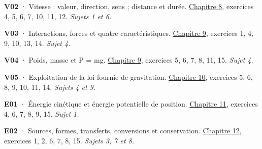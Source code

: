 \par\noindent\begin{minipage}{\linewidth}\textbf{V02} · Vitesse : valeur, direction, sens ; distance et durée. \hyperref[chap-8]{Chapitre 8}, exercices 4, 5, 6, 7, 10, 11, 12. \emph{Sujets 1 et 6.}\par\end{minipage}\par\vspace{2mm}
\par\noindent\begin{minipage}{\linewidth}\textbf{V03} · Interactions, forces et quatre caractéristiques. \hyperref[chap-9]{Chapitre 9}, exercices 1, 4, 9, 10, 13, 14. \emph{Sujet 4.}\par\end{minipage}\par\vspace{2mm}
\par\noindent\begin{minipage}{\linewidth}\textbf{V04} · Poids, masse et P = mg. \hyperref[chap-9]{Chapitre 9}, exercices 5, 6, 7, 8, 11, 15. \emph{Sujet 4.}\par\end{minipage}\par\vspace{2mm}
\par\noindent\begin{minipage}{\linewidth}\textbf{V05} · Exploitation de la loi fournie de gravitation. \hyperref[chap-10]{Chapitre 10}, exercices 5, 6, 8, 9, 10, 11, 14. \emph{Sujets 4 et 9.}\par\end{minipage}\par\vspace{2mm}
\par\noindent\begin{minipage}{\linewidth}\textbf{E01} · Énergie cinétique et énergie potentielle de position. \hyperref[chap-11]{Chapitre 11}, exercices 4, 6, 7, 8, 9, 15. \emph{Sujet 1.}\par\end{minipage}\par\vspace{2mm}
\par\noindent\begin{minipage}{\linewidth}\textbf{E02} · Sources, formes, transferts, conversions et conservation. \hyperref[chap-12]{Chapitre 12}, exercices 1, 2, 6, 7, 8, 15. \emph{Sujets 3, 7 et 8.}\par\end{minipage}\par\vspace{2mm}
